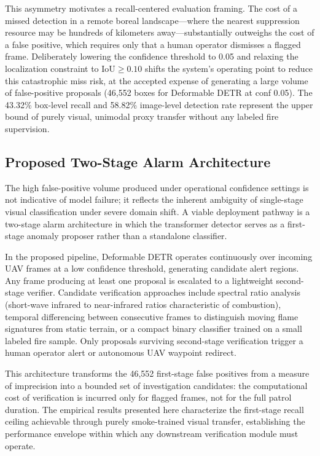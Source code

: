 \documentclass[conference]{IEEEtran}
\begin{document}
This asymmetry motivates a recall-centered evaluation framing. The cost of a missed detection in a remote boreal landscape---where the nearest suppression resource may be hundreds of kilometers away---substantially outweighs the cost of a false positive, which requires only that a human operator dismisses a flagged frame. Deliberately lowering the confidence threshold to 0.05 and relaxing the localization constraint to $\text{IoU} \ge 0.10$ shifts the system's operating point to reduce this catastrophic miss risk, at the accepted expense of generating a large volume of false-positive proposals (46,552 boxes for Deformable DETR at conf 0.05). The 43.32\% box-level recall and 58.82\% image-level detection rate represent the upper bound of purely visual, unimodal proxy transfer without any labeled fire supervision.

\subsection{Proposed Two-Stage Alarm Architecture}
The high false-positive volume produced under operational confidence settings is not indicative of model failure; it reflects the inherent ambiguity of single-stage visual classification under severe domain shift. A viable deployment pathway is a two-stage alarm architecture in which the transformer detector serves as a first-stage anomaly proposer rather than a standalone classifier.

In the proposed pipeline, Deformable DETR operates continuously over incoming UAV frames at a low confidence threshold, generating candidate alert regions. Any frame producing at least one proposal is escalated to a lightweight second-stage verifier. Candidate verification approaches include spectral ratio analysis (short-wave infrared to near-infrared ratios characteristic of combustion), temporal differencing between consecutive frames to distinguish moving flame signatures from static terrain, or a compact binary classifier trained on a small labeled fire sample. Only proposals surviving second-stage verification trigger a human operator alert or autonomous UAV waypoint redirect.

This architecture transforms the 46,552 first-stage false positives from a measure of imprecision into a bounded set of investigation candidates: the computational cost of verification is incurred only for flagged frames, not for the full patrol duration. The empirical results presented here characterize the first-stage recall ceiling achievable through purely smoke-trained visual transfer, establishing the performance envelope within which any downstream verification module must operate.
\end{document}
